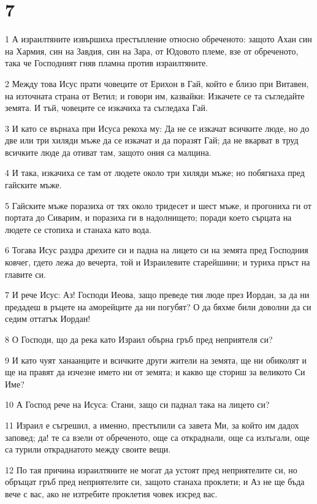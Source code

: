 \chapter{7}

\par 1 А израилтяните извършиха престъпление относно обреченото: защото Ахан син на Хармия, син на Завдия, син на Зара, от Юдовото племе, взе от обреченото, така че Господният гняв пламна против израилтяните.
\par 2 Между това Исус прати човеците от Ерихон в Гай, който е близо при Витавен, на източната страна от Ветил; и говори им, казвайки: Изкачете се та съгледайте земята. И тъй, човеците се изкачиха та съгледаха Гай.
\par 3 И като се върнаха при Исуса рекоха му: Да не се изкачат всичките люде, но до две или три хиляди мъже да се изкачат и да поразят Гай; да не вкарват в труд всичките люде да отиват там, защото ония са малцина.
\par 4 И така, изкачиха се там от людете около три хиляди мъже; но побягнаха пред гайските мъже.
\par 5 Гайските мъже поразиха от тях около тридесет и шест мъже, и прогониха ги от портата до Сиварим, и поразиха ги в надолнището; поради което сърцата на людете се стопиха и станаха като вода.
\par 6 Тогава Исус раздра дрехите си и падна на лицето си на земята пред Господния ковчег, гдето лежа до вечерта, той и Израилевите старейшини; и туриха пръст на главите си.
\par 7 И рече Исус: Аз! Господи Иеова, защо преведе тия люде през Иордан, за да ни предадеш в ръцете на аморейците да ни погубят? О да бяхме били доволни да си седим оттатък Иордан!
\par 8 О Господи, що да река като Израил обърна гръб пред неприятеля си?
\par 9 И като чуят ханаанците и всичките други жители на земята, ще ни обиколят и ще на правят да изчезне името ни от земята; и какво ще сториш за великото Си Име?
\par 10 А Господ рече на Исуса: Стани, защо си паднал така на лицето си?
\par 11 Израил е съгрешил, а именно, престъпили са завета Ми, за който им дадох заповед; да! те са взели от обреченото, още са откраднали, още са излъгали, още са турили откраднатото между своите вещи.
\par 12 По тая причина израилтяните не могат да устоят пред неприятелите си, но обръщат гръб пред неприятелите си, защото станаха проклети; и Аз не ще бъда вече с вас, ако не изтребите проклетия човек изсред вас.
